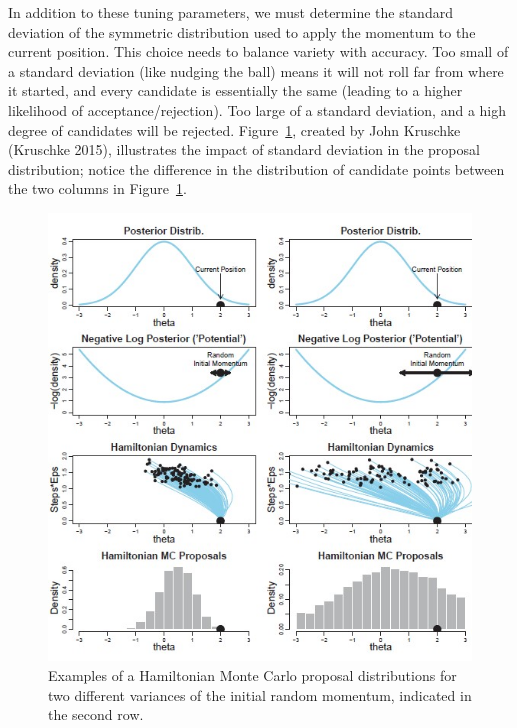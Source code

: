 \documentclass[
  letterpaper,
  DIV=11,
  numbers=noendperiod]{scrreprt}
\theoremstyle{definition}
\theoremstyle{definition}
\theoremstyle{plain}
\theoremstyle{remark}
\begin{document}
In addition to these tuning parameters, we must determine the standard
deviation of the symmetric distribution used to apply the momentum to
the current position. This choice needs to balance variety with
accuracy. Too small of a standard deviation (like nudging the ball)
means it will not roll far from where it started, and every candidate is
essentially the same (leading to a higher likelihood of
acceptance/rejection). Too large of a standard deviation, and a high
degree of candidates will be rejected. Figure~\ref{fig-mcmc-p3}, created
by John Kruschke (Kruschke 2015), illustrates the impact of standard
deviation in the proposal distribution; notice the difference in the
distribution of candidate points between the two columns in
Figure~\ref{fig-mcmc-p3}.

\begin{figure}

{\centering \includegraphics{images/Kruschke-Fig3.jpg}

}

\caption{\label{fig-mcmc-p3}Examples of a Hamiltonian Monte Carlo
proposal distributions for two different variances of the initial random
momentum, indicated in the second row.}

\end{figure}
\end{document}
